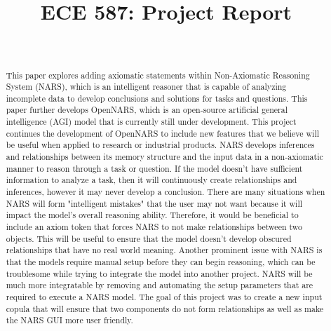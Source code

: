 \documentclass[conference]{IEEEtran}
\begin{document}
\title{ECE 587: Project Report}

\author{
\\
\and
{}

}

\maketitle


\begin{abstract}

This paper explores adding axiomatic statements within Non-Axiomatic Reasoning System (NARS), which is an intelligent reasoner that is capable of analyzing incomplete data to develop conclusions and solutions for tasks and questions. This paper further develops OpenNARS, which is an open-source artificial general intelligence (AGI) model that is currently still under development. This project continues the development of OpenNARS to include new features that we believe will be useful when applied to research or industrial products. NARS develops inferences and relationships between its memory structure and the input data in a non-axiomatic manner to reason through a task or question. If the model doesn't have sufficient information to analyze a task, then it will continuously create relationships and inferences, however it may never develop a conclusion. There are many situations when NARS will form "intelligent mistakes" that the user may not want because it will impact the model's overall reasoning ability. Therefore, it would be beneficial to include an axiom token that forces NARS to not make relationships between two objects. This will be useful to ensure that the model doesn't develop obscured relationships that have no real world meaning. Another prominent issue with NARS is that the models require manual setup before they can begin reasoning, which can be troublesome while trying to integrate the model into another project. NARS will be much more integratable by removing and automating the setup parameters that are required to execute a NARS model. The goal of this project was to create a new input copula that will ensure that two components do not form relationships as well as make the NARS GUI more user friendly.

\end{abstract}
\end{document}
